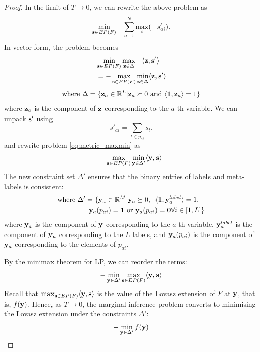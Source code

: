 {{{\begin{proof}
In the limit of $T \to 0$, we can rewrite the above problem as
\begin{equation}
    \min_{{\bf s} \in EP(F)} \quad \sum_{a = 1}^{N} \max_{i} (-s'_{ai}).
\end{equation}
In vector form, the problem becomes
\begin{align}
    &\min_{{\bf s} \in EP(F)} \max_{{\bf z} \in \Delta} - \langle {\bf z}, {\bf s'} \rangle \\
    & = - \max_{{\bf s} \in EP(F)} \min_{{\bf z} \in \Delta} \langle {\bf z}, {\bf s'} \rangle
\end{align}
\begin{equation}
    \text{where } \Delta = \{{\bf z}_a \in \mathbb{R}^L | {\bf z}_a \succeq 0  \textrm{ and } \langle {\bf 1}, {\bf z}_a \rangle = 1\}
\end{equation}
where ${\bf z}_a$ is the component of $\bf z$ corresponding to the $a$-th variable. We can unpack $\bf s'$ using 
\begin{equation}
s'_{ai} = \sum_{t \in p_{ai}} s_t.
\end{equation}
and rewrite problem \eqref{eq:metric_maxmin} as
\begin{align}
    - \max_{{\bf s} \in EP(F)} \min_{{\bf y} \in \Delta'} \langle {\bf y}, {\bf s} \rangle
\end{align}
The new constraint set $\Delta'$ ensures that the binary entries of labels and meta-labels is consistent:
\begin{align}
    \textrm{where } \Delta' &= \{ {\bf y}_a \in \mathbb{R}^M | {\bf y}_a \succeq 0, \enskip \langle {\bf 1}, {\bf y}_a^{label} \rangle = 1, \nonumber \\
    &\enskip {\bf y}_a(p_{ai}) = {\bf 1} \textrm{ or } {\bf y}_a(p_{ai}) = {\bf 0} \forall i \in [1, L]\}
\end{align} 
where ${\bf y}_a$ is the component of $\bf y$ corresponding to the $a$-th variable, ${\bf y}_a^{label}$  is the component of ${\bf y}_a$ corresponding to the $L$ labels, and ${\bf y}_a(p_{ai})$ is the component of ${\bf y}_a$ corresponding to the elements of $p_{ai}$. 

By the minimax theorem for LP, we can reorder the terms:
\begin{equation}
    - \min_{{\bf y} \in \Delta'} \max_{{\bf s} \in EP(F)} \langle {\bf y}, {\bf s} \rangle 
\end{equation}
Recall that $\max_{{\bf s} \in EP(F)} \langle {\bf y}, {\bf s} \rangle$ is the value of the Lovasz extension of $F$ at $\bf y$, that is, $f({\bf y})$. Hence, as $T \to 0$, the marginal inference problem converts to minimising the Lovasz extension under the constraints $\Delta'$:
\begin{equation}
    - \min_{{\bf y} \in \Delta'} f({\bf y}) 
\end{equation}
\end{proof}

}}}
